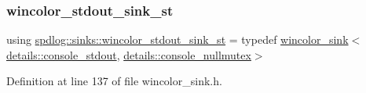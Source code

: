 \mbox{\label{namespacespdlog_1_1sinks_ad668215540fc681bd8051e6a8a0c714c}} 
\subsubsection{\texorpdfstring{wincolor\+\_\+stdout\+\_\+sink\+\_\+st}{wincolor\_stdout\_sink\_st}}
{\footnotesize\ttfamily using \hyperlink{namespacespdlog_1_1sinks_ad668215540fc681bd8051e6a8a0c714c}{spdlog\+::sinks\+::wincolor\+\_\+stdout\+\_\+sink\+\_\+st} = typedef \hyperlink{classspdlog_1_1sinks_1_1wincolor__sink}{wincolor\+\_\+sink}$<$\hyperlink{structspdlog_1_1details_1_1console__stdout}{details\+::console\+\_\+stdout}, \hyperlink{structspdlog_1_1details_1_1console__nullmutex}{details\+::console\+\_\+nullmutex}$>$}



Definition at line 137 of file wincolor\+\_\+sink.\+h.

